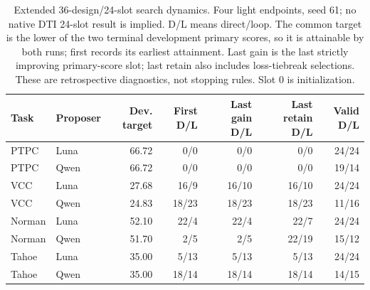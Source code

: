 \begin{table}[htbp]
\caption{Extended 36-design/24-slot search dynamics. Four light endpoints, seed 61; no native DTI 24-slot result is implied. D/L means direct/loop. The common target is the lower of the two terminal development primary scores, so it is attainable by both runs; first records its earliest attainment. Last gain is the last strictly improving primary-score slot; last retain also includes loss-tiebreak selections. These are retrospective diagnostics, not stopping rules. Slot 0 is initialization.}
\label{tab:completed-dynamics-long24}
\centering\small
\setlength{\tabcolsep}{4pt}
\begin{tabularx}{\linewidth}{@{}Xlrrrrr@{}}
\toprule
Task & Proposer & Dev. target & First D/L & Last gain D/L & Last retain D/L & Valid D/L \\
\midrule
PTPC & Luna & 66.72 & 0/0 & 0/0 & 0/0 & 24/24 \\
PTPC & Qwen & 66.72 & 0/0 & 0/0 & 0/0 & 19/14 \\
VCC & Luna & 27.68 & 16/9 & 16/10 & 16/10 & 24/24 \\
VCC & Qwen & 24.83 & 18/23 & 18/23 & 18/23 & 11/16 \\
Norman & Luna & 52.10 & 22/4 & 22/4 & 22/7 & 24/24 \\
Norman & Qwen & 51.70 & 2/5 & 2/5 & 22/19 & 15/12 \\
Tahoe & Luna & 35.00 & 5/13 & 5/13 & 5/13 & 24/24 \\
Tahoe & Qwen & 35.00 & 18/14 & 18/14 & 18/14 & 14/15 \\
\bottomrule
\end{tabularx}
\end{table}
